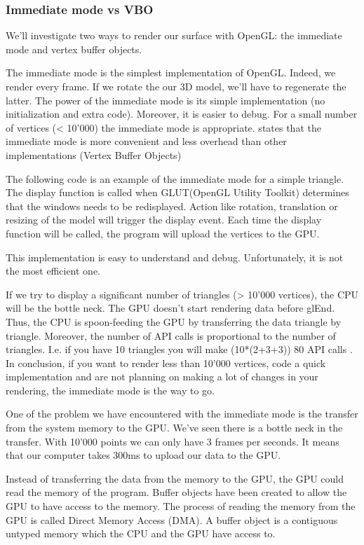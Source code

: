 \subsubsection{Immediate mode vs VBO}

We'll investigate two ways to render our surface with OpenGL: the immediate mode and vertex buffer objects.

The immediate mode is the simplest implementation of OpenGL. Indeed, we render  every frame. If we rotate the our 3D model, we'll have to regenerate the latter. The power of the immediate mode is its simple implementation (no initialization and extra code). Moreover, it is easier to debug. For a small number of vertices (< 10'000) the immediate mode is appropriate. \cite{opengl1} states that the immediate mode is more convenient and less overhead than other implementations (Vertex Buffer Objects)

The following code is an example of the immediate mode for a simple triangle. The display function is called when GLUT(OpenGL Utility Toolkit) determines that the windows needs to be redisplayed. Action like rotation, translation or resizing of the model will trigger the display event. Each time the display function will be called, the program will upload the vertices to the GPU.

This implementation is easy to understand and debug. Unfortunately, it is not the most efficient one. 

If we try to display a significant number of triangles (> 10'000 vertices), the CPU will be the bottle neck. The GPU doesn't start rendering data before glEnd. Thus, the CPU is spoon-feeding the GPU by transferring the data triangle by triangle. Moreover, the number of API calls is proportional to the number of triangles. I.e. if you have 10 triangles you will make (10*(2+3+3)) 80 API calls \cite{opengllegacy}. In conclusion, if you want to render less than 10'000 vertices, code a quick implementation and are not planning on making a lot of changes in your rendering, the immediate mode is the way to go.


One of the problem we have encountered with the immediate mode is the transfer from the system memory to the GPU.  We've seen there is a bottle neck in the transfer. With 10'000 points we can only have 3 frames per seconds. It means that our computer takes 300ms to upload our data to the GPU.

Instead of transferring the data from the memory to the GPU, the GPU could read the memory of the program. Buffer objects have been created to allow the GPU to have access to the memory. The process of reading the memory from the GPU is called Direct Memory Access (DMA). A buffer object is a contiguous untyped memory which the CPU and the GPU have access to.

